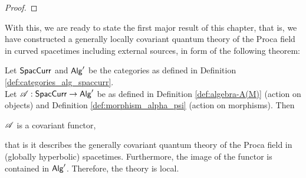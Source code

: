 \begin{proof}
\end{proof}
%
%
%
%
%
%
%
%
%
%
%
With this, we are ready to state the first major result of this chapter, that is, we have constructed a generally locally covariant quantum theory of the Proca field in curved spacetimes including external sources,  in form of the following theorem:
\begin{theorem}
Let $\SpacCurr$ and $\Alg'$ be the categories as defined in Definition \ref{def:categories_alg_spaccurr}.\\
Let $\AA : \SpacCurr \to \Alg'$ be as defined in Definition \ref{def:algebra-A(M)} (action on objects) and Definition \ref{def:morphism_alpha_psi} (action on morphisms). Then
\begin{center}
$\AA$ is a covariant functor,
\end{center}
that is it describes the generally covariant quantum theory of the Proca field in (globally hyperbolic) spacetimes.
Furthermore, the image of the functor is contained in $\Alg'$. Therefore, the theory is local.
\end{theorem}
